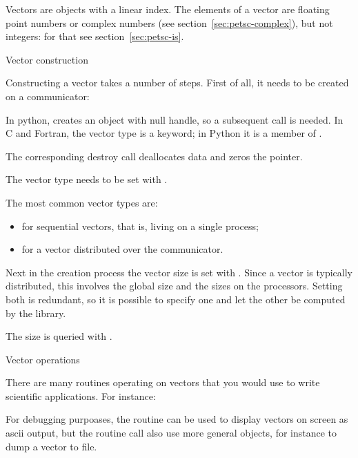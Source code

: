 Vectors are objects with a linear index. The elements of a vector are
floating point numbers or complex numbers (see
section~\ref{sec:petsc-complex}), but not integers: for that see
section~\ref{sec:petsc-is}.

 {Vector construction}

Constructing a vector takes a number of steps. First of all, it needs
to be created on a communicator:
%

\begin{pythonnote}
  In python,  creates an object with null handle, so a
  subsequent  call is needed.
  In C and Fortran, the vector type is a keyword; in Python it is a
  member of .
\end{pythonnote}

The corresponding  destroy call deallocates data and zeros
the pointer.
%

The vector type needs to be set with .
%

The most common vector types are:
\begin{itemize}
\item {} for sequential vectors, that is, living on a single process;
\item {} for a vector distributed over the communicator.
\end{itemize}

Next in the creation process the vector size is set with .
Since a
vector is typically distributed, this involves the global size and the
sizes on the processors. Setting both is redundant, so it is possible
to specify one and let the other be computed by the library.
%

The size is queried with .
%

 {Vector operations}

There are many routines operating on vectors that you would
use to write scientific applications. For instance:
%

For debugging purpoases,
the  routine can be used to display vectors on screen as
ascii output,
%
%
but the routine call also use more general  objects, for
instance to dump a vector to file.

